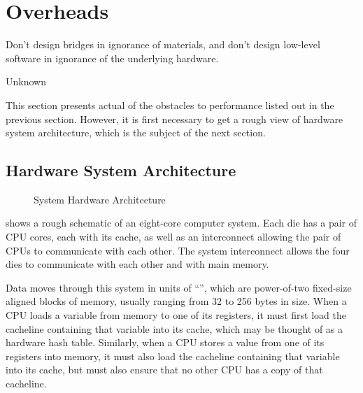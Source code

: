 
\section{Overheads}
\label{sec:cpu:Overheads}
%
\epigraph{Don't design bridges in ignorance of materials, and don't design
	  low-level software in ignorance of the underlying hardware.}
	 {Unknown}

This section presents actual  of the obstacles to performance
listed out in the previous section.
However, it is first necessary to get a rough view of hardware system
architecture, which is the subject of the next section.

\subsection{Hardware System Architecture}
\label{sec:cpu:Hardware System Architecture}

\begin{figure}
\centering
{}
\caption{System Hardware Architecture}
\label{fig:cpu:System Hardware Architecture}
\end{figure}

shows a rough schematic of an eight-core computer system.
Each die has a pair of CPU cores, each with its cache, as well as an
interconnect allowing the pair of CPUs to communicate with each other.
The system interconnect allows the four dies to communicate with each
other and with main memory.

Data moves through this system in units of ``'', which
are power-of-two fixed-size aligned blocks of memory, usually ranging
from 32 to 256 bytes in size.
When a CPU loads a variable from memory to one of its registers, it must
first load the cacheline containing that variable into its cache,
which may be thought of as a hardware hash table.
Similarly, when a CPU stores a value from one of its registers into
memory, it must also load the cacheline containing that variable into
its cache, but must also ensure that no other CPU has a copy of that
cacheline.

